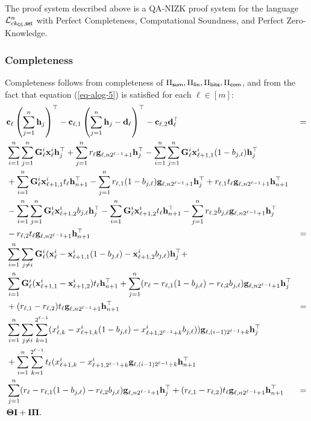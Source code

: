 \begin{theorem} \label{theo:bits}
The proof system described above is a QA-NIZK proof system for the language \(\mathcal{L}_{ck_{\mathsf{GS}},\mathsf{set}}^n\)
 with Perfect Completeness, Computational Soundness, and Perfect Zero-Knowledge.
\end{theorem}	

\subsubsection{Completeness}
Completeness follows from completeness of \(\Pi_{\mathsf{sum}},\Pi_\mathsf{lin},\Pi_{\mathsf{bits}},\Pi_{\mathsf{com}}\), and from the fact that equation (\ref{eq-alog-5}) is satisfied for each \(\ell\in [m]\):
\begin{align*}
&\mathbf{c}_\ell\left(\sum_{j=1}^n \mathbf{h}_j\right)^\top-
\mathbf{c}_{\ell,1}\left(\sum_{j=1}^n\mathbf{h}_j-\mathbf{d}_\ell\right)^\top-
\mathbf{c}_{\ell,2}\mathbf{d}_\ell^\top &= \\
&\sum_{i=1}^n\sum_{j=1}^n\mathbf{{G}}^i_{\ell}\mathbf{x}^i_{\ell}\mathbf{h}_j^\top+\sum_{j=1}^nr_\ell\mathbf{g}_{\ell,n2^{\ell-1}+1}\mathbf{h}_j^\top
-\sum_{i=1}^n\sum_{j=1}^n\mathbf{{G}}^i_{\ell}\mathbf{x}^i_{\ell+1,1}(1-b_{j,\ell})\mathbf{h}_j^\top\\
&+\sum_{i=1}^n\mathbf{{G}}^i_{\ell}\mathbf{x}^i_{\ell+1,1} t_\ell\mathbf{h}_{n+1}^\top-\sum_{j=1}^nr_{\ell,1}(1-b_{j,\ell})\mathbf{g}_{\ell,n2^{\ell-1}+1}\mathbf{h}_j^\top+ r_{\ell,1}t_\ell\mathbf{g}_{\ell,n2^{\ell-1}+1}\mathbf{h}_{n+1}^\top\\
&-\sum_{i=1}^n\sum_{j=1}^n\mathbf{{G}}^i_{\ell}\mathbf{x}^i_{\ell+1,2}b_{j,\ell}\mathbf{h}_j^\top-\sum_{i=1}^n\mathbf{{G}}^i_{\ell}\mathbf{x}^i_{\ell+1,2} t_\ell\mathbf{h}_{n+1}^\top-\sum_{j=1}^nr_{\ell,2}b_{j,\ell}\mathbf{g}_{\ell,n2^{\ell-1}+1}\mathbf{h}_j^\top\\
&- r_{\ell,2}t_\ell\mathbf{g}_{\ell,n2^{\ell-1}+1}\mathbf{h}_{n+1}^\top &=\\
&\sum_{i=1}^n\sum_{j\neq i}\mathbf{{G}}^i_\ell(\mathbf{x}^i_\ell-\mathbf{x}^i_{\ell+1,1}(1-b_{j,\ell})-\mathbf{x}^i_{\ell+1,2}b_{j,\ell})\mathbf{h}_j^\top+\\
&\sum_{i=1}^n\mathbf{{G}}^i_\ell(\mathbf{x}^i_{\ell+1,1}-\mathbf{x}^i_{\ell+1,2})t_\ell\mathbf{h}_{n+1}^\top+\sum_{j=1}^n(r_\ell-r_{\ell,1}(1-b_{j,\ell})-r_{\ell,2}b_{j,\ell})\mathbf{g}_{\ell,n2^{\ell-1}+1}\mathbf{h}_{j}^\top\\
&+(r_{\ell,1}-r_{\ell,2})t_\ell\mathbf{g}_{\ell,n2^{\ell-1}+1}\mathbf{h}_{n+1}^\top &=\\
&\sum_{i=1}^n\sum_{j\neq i}\sum_{k=1}^{2^{\ell-1}}(x^i_{\ell,k}-x^i_{\ell+1,k}(1-b_{j,\ell})-x^i_{\ell+1,2^{\ell-1}+k}b_{j,\ell}))\mathbf{g}_{\ell,(i-1)2^{\ell-1}+k}\mathbf{h}_j^\top\\
&+\sum_{i=1}^n\sum_{k=1}^{2^{\ell-1}}t_\ell(x^i_{\ell+1,k}-x^i_{\ell+1,2^{\ell-1}+k}\mathbf{g}_{\ell,(i-1)2^{\ell-1}+k}\mathbf{h}_{n+1}^\top\\
&\sum_{j=1}^n(r_\ell-r_{\ell,1}(1-b_{j,\ell})-r_{\ell,2}b_{j,\ell})\mathbf{g}_{\ell,n2^{\ell-1}+1}\mathbf{h}_{j}^\top+(r_{\ell,1}-r_{\ell,2})t_\ell\mathbf{g}_{\ell,n2^{\ell-1}+1}\mathbf{h}_{n+1}^\top &=\\
&\mathbf{{\Theta}}\mathbf{{I}}+\mathbf{{I}}\mathbf{{\Pi}}.
\end{align*}

